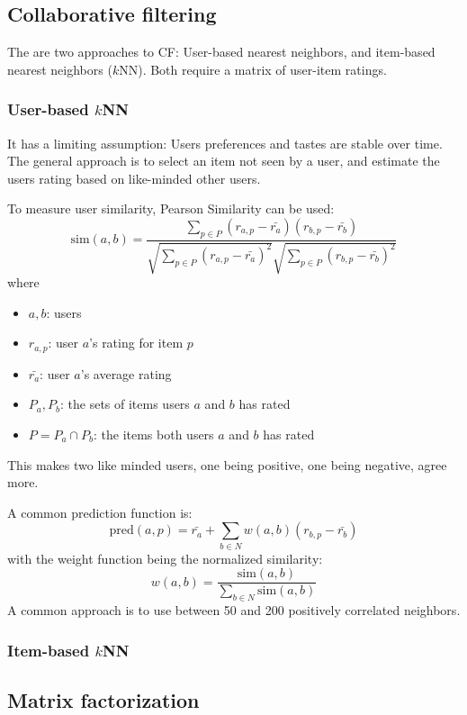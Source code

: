 \subsection{Collaborative filtering}
The are two approaches to CF: User-based nearest neighbors, and item-based nearest neighbors ($k$NN).
Both require a matrix of user-item ratings.

\subsubsection{User-based $k$NN}
It has a limiting assumption: Users preferences and tastes are stable over time.
The general approach is to select an item not seen by a user, and estimate the users rating based on like-minded other users.

To measure user similarity, Pearson Similarity can be used:
\[
    \mathrm{sim}(a, b) = \frac{\sum_{p \in P}(r_{a, p} - \bar{r_a})(r_{b, p} - \bar{r_b})}{\sqrt{\sum_{p \in P}(r_{a, p} - \bar{r_a})^2}\sqrt{\sum_{p \in P}(r_{b, p} - \bar{r_b})^2}}
\]
where
\begin{itemize}
    \item $a, b$: users
    \item $r_{a, p}$: user $a$'s rating for item $p$
    \item $\bar{r_a}$: user $a$'s average rating
    \item $P_a, P_b$: the sets of items users $a$ and $b$ has rated
    \item $P = P_a \cap P_b$: the items both users $a$ and $b$ has rated
\end{itemize}
This makes two like minded users, one being positive, one being negative, agree more.

A common prediction function is:
\[
    \mathrm{pred}(a, p) = \bar{r_a} + \sum_{b \in N}w(a, b)(r_{b, p} - \bar{r_b})
\]
with the weight function being the normalized similarity:
\[
    w(a, b) = \frac{\mathrm{sim}(a, b)}{\sum_{b \in N}\mathrm{sim}(a, b)}
\]
A common approach is to use between 50 and 200 positively correlated neighbors.

\subsubsection{Item-based $k$NN}

\subsection{Matrix factorization}


